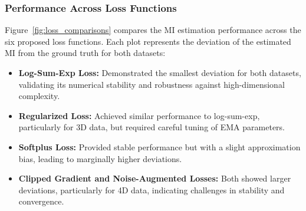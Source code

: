 \documentclass[lettersize,journal]{IEEEtran}
\begin{document}
\subsubsection{Performance Across Loss Functions}
Figure~\ref{fig:loss_comparisons} compares the MI estimation performance across the six proposed loss functions. Each plot represents the deviation of the estimated MI from the ground truth for both datasets:
\begin{itemize}
    \item \textbf{Log-Sum-Exp Loss:} Demonstrated the smallest deviation for both datasets, validating its numerical stability and robustness against high-dimensional complexity.
    \item \textbf{Regularized Loss:} Achieved similar performance to log-sum-exp, particularly for 3D data, but required careful tuning of EMA parameters.
    \item \textbf{Softplus Loss:} Provided stable performance but with a slight approximation bias, leading to marginally higher deviations.
    \item \textbf{Clipped Gradient and Noise-Augmented Losses:} Both showed larger deviations, particularly for 4D data, indicating challenges in stability and convergence.
\end{itemize}
\end{document}
